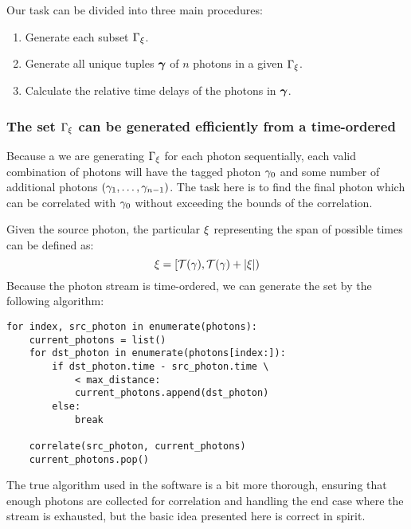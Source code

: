Our task can be divided into three main procedures:
\begin{enumerate}
\item Generate each subset $\Gamma_{\xi}$.
\item Generate all unique tuples $\boldsymbol{\gamma}$ of $n$ photons in a given $\Gamma_{\xi}$.
\item Calculate the relative time delays of the photons in $\boldsymbol{\gamma}$.
\end{enumerate}

\subsubsection{The set $\Gamma_{\xi}$ can be generated efficiently from a time-ordered \photons}
Because a we are generating $\Gamma_{\xi}$ for each photon sequentially, each valid combination of photons will have the tagged photon $\gamma_{0}$ and some number of additional photons $(\gamma_{1},\ldots,\gamma_{n-1})$. The task here is to find the final photon which can be correlated with $\gamma_{0}$ without exceeding the bounds of the correlation.

Given the source photon, the particular $\xi$ representing the span of possible times can be defined as:
\begin{equation}
\xi = \left[ \mathcal{T}(\gamma), \mathcal{T}(\gamma) + \left|\xi\right| \right)
\end{equation}
Because the photon stream is time-ordered, we can generate the set by the following algorithm:
\lstset{language=Python}
\begin{lstlisting}
for index, src_photon in enumerate(photons):
    current_photons = list()
    for dst_photon in enumerate(photons[index:]):
        if dst_photon.time - src_photon.time \ 
            < max_distance:
            current_photons.append(dst_photon)
        else:
            break

    correlate(src_photon, current_photons)
    current_photons.pop()
\end{lstlisting}
The true algorithm used in the software is a bit more thorough, ensuring that enough photons are collected for correlation and handling the end case where the stream is exhausted, but the basic idea presented here is correct in spirit.

